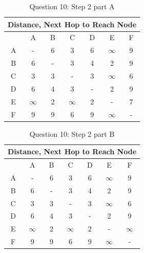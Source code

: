 \documentclass[12pt,addpoints,answers]{exam}
\begin{document}
\begin{questions}
\begin{solution}[5in]
\begin{table}[H]
	\centering
	\caption{Question 10: Step 2  part A}
	\label{Solution 10}
	\begin{tabular}{|c|c|c|c|c|c|c|}
		\hline
		\multicolumn{7}{|c|}{Distance, Next Hop to Reach Node} \\ \hline
			 & A   & B   & C       & D     & E   & F   				\\ \hline
		A    & -   & 6   & 3          & 6   & $\infty$          & 9   \\
		B    & 6   & -   & 3          & 4   & 2          & 9   \\
		C    & 3   & 3   & -          & 3   & $\infty$   & 6   \\
		D    & 6   & 4   & 3          & -   & 2          & 9   \\
		E    & $\infty$   & 2   & $\infty$   & 2   & -          & 7   \\
		F    & 9   & 9   & 6          & 9   & $\infty$          & -  \\ \hline
	\end{tabular}
\end{table}
\begin{table}[H]
	\centering
	\caption{Question 10: Step 2  part B}
	\label{Solution 10}
	\begin{tabular}{|c|c|c|c|c|c|c|}
		\hline
		\multicolumn{7}{|c|}{Distance, Next Hop to Reach Node} \\ \hline
		     & A   & B   & C          & D     	& E   & F   				\\ \hline
		A    & -   & 6   & 3          & 6   & $\infty$          & 9   \\
		B    & 6   & -   & 3          & 4   	& 2          & 9   \\
		C    & 3   & 3   & -          & 3   	& $\infty$   & 6   \\
		D    & 6   & 4   & 3          & -   	& 2          & 9   \\
		E    & $\infty$   & 2   & $\infty$   	& 2   & -          & $\infty$   \\
		F    & 9   & 9   & 6          & 9   	& $\infty$          & -  \\ \hline
	\end{tabular}
\end{table}


\end{solution}
\end{questions}
\end{document}
